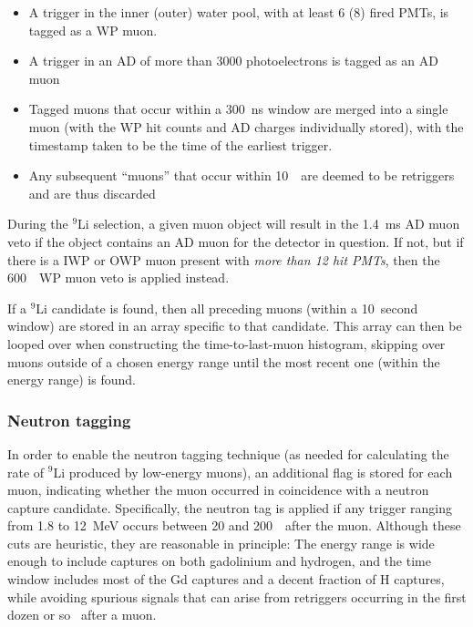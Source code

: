 \documentclass[../thesis.tex]{subfiles}
\begin{document}
\begin{itemize}
\item A trigger in the inner (outer) water pool, with at least 6 (8) fired PMTs, is tagged as a WP muon.
\item A trigger in an AD of more than 3000 photoelectrons is tagged as an AD muon
\item Tagged muons that occur within a 300~ns window are merged into a single muon (with the WP hit counts and AD charges individually stored), with the timestamp taken to be the time of the earliest trigger.
\item Any subsequent ``muons'' that occur within 10~\us\ are deemed to be retriggers and are thus discarded
\end{itemize}

During the $^9$Li selection, a given muon object will result in the 1.4~ms AD muon veto if the object contains an AD muon for the detector in question. If not, but if there is a IWP or OWP muon present with \emph{more than 12 hit PMTs}, then the 600~\us\ WP muon veto is applied instead.

If a $^9$Li candidate is found, then all preceding muons (within a 10~second window) are stored in an array specific to that candidate. This array can then be looped over when constructing the time-to-last-muon histogram, skipping over muons outside of a chosen energy range until the most recent one (within the energy range) is found.

\subsubsection{Neutron tagging}
\label{sec:bkgLi9NeuTag}

In order to enable the neutron tagging technique (as needed for calculating the rate of $^9$Li produced by low-energy muons), an additional flag is stored for each muon, indicating whether the muon occurred in coincidence with a neutron capture candidate. Specifically, the neutron tag is applied if any trigger ranging from 1.8 to 12~MeV
occurs between 20 and 200~\us\ after the muon. Although these cuts are heuristic, they are reasonable in principle: The energy range is wide enough to include captures on both gadolinium and hydrogen, and the time window includes most of the Gd captures and a decent fraction of H captures, while avoiding spurious signals that can arise from retriggers occurring in the first dozen or so \us\ after a muon.
\end{document}
